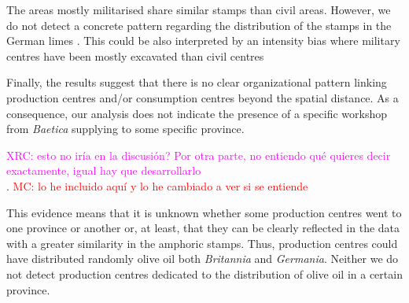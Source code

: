 \documentclass[review]{elsarticle}
\newcommand{\memo}[2]{\textcolor{#1}{#2}}
\newcommand{\maria}[1]{\memo{red}{MC: #1\\}}
\newcommand{\xavi}[1]{\memo{magenta}{XRC: #1\\}}
\begin{document}

The areas mostly militarised share similar stamps than civil areas. However, we do not detect a concrete pattern regarding the distribution of the stamps in the German limes \citep{xanten2018}. This could be also interpreted by an intensity bias where military centres have been mostly excavated than civil centres




Finally, the results suggest that there is no clear organizational pattern linking production centres and/or consumption centres beyond the spatial distance. As a consequence, our analysis does not indicate the presence of a specific workshop from \textit{Baetica} supplying to some specific province. 

\xavi{esto no iría en la discusión? Por otra parte, no entiendo qué quieres decir exactamente, igual hay que desarrollarlo}.
\maria{lo he incluido aquí y lo he cambiado a ver si se entiende}

This evidence means that it is unknown whether some production centres went to one province or another or, at least, that they can be clearly reflected in the data with a greater similarity in the amphoric stamps. Thus, production centres could have distributed randomly olive oil both \textit{Britannia} and \textit{Germania}. Neither we do not detect production centres dedicated to the distribution of olive oil in a certain province. 


\end{document}

